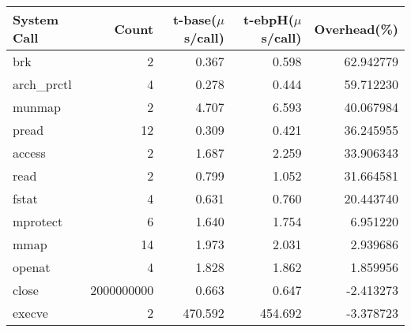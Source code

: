 \begin{tabular}{lrrrr}
\toprule
 System Call &       Count &  t-base($\mu$s/call) &  t-ebpH($\mu$s/call) &  Overhead(\%) \\
\midrule
         brk &           2 &                0.367 &                0.598 &     62.942779 \\
 arch\_prctl &           4 &                0.278 &                0.444 &     59.712230 \\
      munmap &           2 &                4.707 &                6.593 &     40.067984 \\
       pread &          12 &                0.309 &                0.421 &     36.245955 \\
      access &           2 &                1.687 &                2.259 &     33.906343 \\
        read &           2 &                0.799 &                1.052 &     31.664581 \\
       fstat &           4 &                0.631 &                0.760 &     20.443740 \\
    mprotect &           6 &                1.640 &                1.754 &      6.951220 \\
        mmap &          14 &                1.973 &                2.031 &      2.939686 \\
      openat &           4 &                1.828 &                1.862 &      1.859956 \\
       close &  2000000000 &                0.663 &                0.647 &     -2.413273 \\
      execve &           2 &              470.592 &              454.692 &     -3.378723 \\
\bottomrule
\end{tabular}
